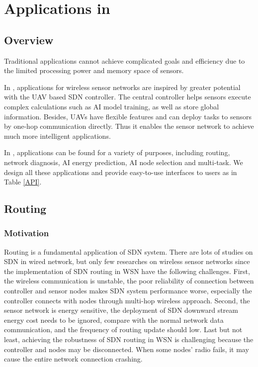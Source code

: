 \section{Applications in {\sdn}}
\label{App}

\subsection{Overview}

Traditional applications cannot achieve complicated goals and efficiency due 
to the limited processing power and memory space of sensors.

In {\sdn}, applications for wireless sensor networks are inspired by 
greater potential with the UAV based SDN controller. The central controller
helps sensors execute complex calculations such as AI model training, as well 
as store global information. Besides, UAVs have flexible features and can deploy 
tasks to sensors by one-hop communication directly. Thus it enables the sensor network
to achieve much more intelligent applications.

In {\sdn}, applications can be found for a variety of purposes, including routing, network diagnosis,
AI energy prediction, AI node selection and multi-task. We design all these applications and provide 
easy-to-use interfaces to users as in Table \ref{API}.



\subsection{Routing}
\label{subsectionrouting}

\subsubsection{Motivation}

Routing is a fundamental application of SDN system. There are lots of studies on SDN in wired network, but only few researches on wireless sensor networks since the implementation of SDN routing in WSN have the following challenges. First, the wireless communication is unstable, the poor reliability of connection between controller and sensor nodes makes SDN system performance worse, especially the controller connects with nodes through multi-hop wireless approach. 
Second, the sensor network is energy sensitive, the deployment of SDN downward stream energy cost needs to be ignored, compare with the normal network data communication, and the frequency of routing update should low. 
Last but not least, achieving the robustness of SDN routing in WSN is challenging because the controller and nodes may be disconnected. When some nodes' radio fails, it may cause the entire network connection crashing.

